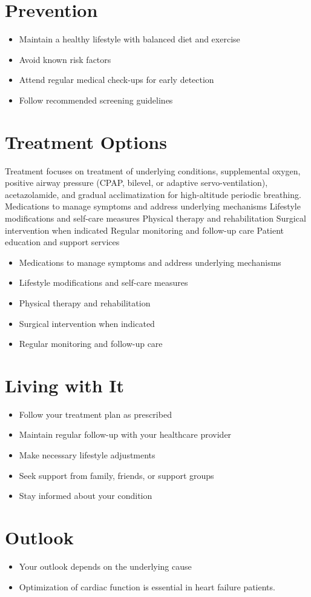 \section{Prevention}
\begin{itemize}[noitemsep]
  \item Maintain a healthy lifestyle with balanced diet and exercise
  \item Avoid known risk factors
  \item Attend regular medical check-ups for early detection
  \item Follow recommended screening guidelines
\end{itemize}
\section{Treatment Options}
Treatment focuses on treatment of underlying conditions, supplemental oxygen, positive airway pressure (CPAP, bilevel, or adaptive servo-ventilation), acetazolamide, and gradual acclimatization for high-altitude periodic breathing. Medications to manage symptoms and address underlying mechanisms Lifestyle modifications and self-care measures Physical therapy and rehabilitation Surgical intervention when indicated Regular monitoring and follow-up care Patient education and support services

\begin{itemize}[noitemsep]
  \item Medications to manage symptoms and address underlying mechanisms
  \item Lifestyle modifications and self-care measures
  \item Physical therapy and rehabilitation
  \item Surgical intervention when indicated
  \item Regular monitoring and follow-up care
\end{itemize}
\section{Living with It}
\begin{itemize}[noitemsep]
  \item Follow your treatment plan as prescribed
  \item Maintain regular follow-up with your healthcare provider
  \item Make necessary lifestyle adjustments
  \item Seek support from family, friends, or support groups
  \item Stay informed about your condition
\end{itemize}
\section{Outlook}
\begin{itemize}[noitemsep]
  \item Your outlook depends on the underlying cause
  \item Optimization of cardiac function is essential in heart failure patients.
\end{itemize}
